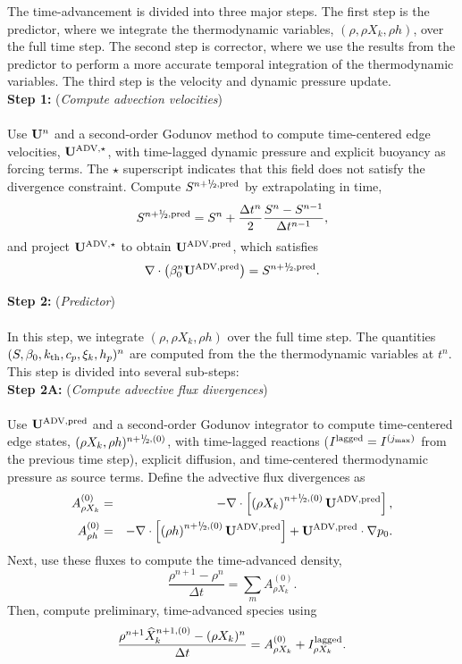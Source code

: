 The time-advancement is divided into three major steps.  The first step is the predictor, where we integrate the thermodynamic variables, $(\rho,\rho X_k,\rho h)$, over the full time step.  The second step is corrector, where we use the results from the predictor to perform a more accurate temporal integration of the thermodynamic variables.  The third step is the velocity and dynamic pressure update.\\

{\bf Step 1:} ({\it Compute advection velocities})\\ \\
Use ${\bf U}^n$ and a second-order Godunov method to compute time-centered edge velocities, $\mathbf{U}^{\mathrm{ADV},\star}$, with time-lagged dynamic pressure and explicit buoyancy as forcing terms.  The $\star$ superscript indicates that this field does not satisfy the divergence constraint.  Compute $S^{n+\myhalf,{\rm pred}}$ by extrapolating in time,
\begin{equation}
S^{n+\myhalf,{\rm pred}} = S^n + \frac{\Delta t^n}{2}\frac{S^n - S^{n-1}}{\Delta t^{n-1}},
\end{equation}
and project $\mathbf{U}^{\mathrm{ADV},\star}$ to obtain $\mathbf{U}^{\mathrm{ADV},\mathrm{pred}}$, which satisfies
\begin{equation}
\nabla\cdot\left(\beta_0^n\uadvsdcpred\right) = S^{n+\myhalf,\rm{pred}}.
\end{equation}

{\bf Step 2:} ({\it Predictor})\\ \\
 In this step, we integrate $(\rho, \rho X_k, \rho h)$ over the full time step.  The quantities $(S, \beta_0, k_{\rm th}, c_p, \xi_k, h_p)^n$ are computed from the the thermodynamic variables at $t^n$.  This step is divided into several sub-steps:\\

{\bf Step 2A:} ({\it Compute advective flux divergences})\\ \\
Use $\mathbf{U}^{\mathrm{ADV},\mathrm{pred}}$ and a second-order Godunov integrator to compute time-centered edge states, $(\rho X_k, \rho h)^{n+\myhalf,(0)}$, with time-lagged reactions ($I^{\rm lagged} = I^{(j_{\rm max})}$ from the previous time step), explicit diffusion, and time-centered thermodynamic pressure as source terms.  Define the advective flux divergences as
\begin{eqnarray}
A_{\rho X_k}^{(0)} &=& -\nabla\cdot\left[\left(\rho X_k\right)^{n+\myhalf,{(0)}}\uadvsdcpred\right],\\
A_{\rho h}^{(0)} &=& -\nabla\cdot\left[\left(\rho h\right)^{n+\myhalf,(0)}\uadvsdcpred\right] + \uadvsdcpred\cdot\nabla p_0.
\end{eqnarray}
Next, use these fluxes to compute the time-advanced density,
\begin{equation}
\frac{\rho^{n+1} - \rho^n}{\Delta t} = \sum_mA_{\rho X_k}^{(0)}.
\end{equation}
Then, compute preliminary, time-advanced species using
\begin{equation}
\frac{\rho^{n+1}\widehat{X}_k^{n+1,(0)} - (\rho X_k)^n}{\Delta t} = A_{\rho X_k}^{(0)} + I_{\rho X_k}^{\rm lagged}.\label{eq:sdc species 2}
\end{equation}

